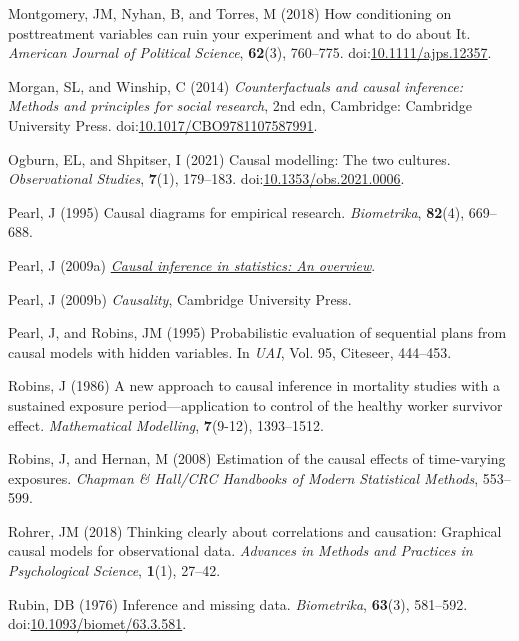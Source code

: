 \documentclass[
  singlecolumn]{article}
\newlength{\cslhangindent}
\newenvironment{CSLReferences}[2] %
 {\begin{list}{}{%
  \setlength{\itemindent}{0pt}
  \setlength{\leftmargin}{0pt}
  \setlength{\parsep}{0pt}
  \ifodd #1
   \setlength{\leftmargin}{\cslhangindent}
   \setlength{\itemindent}{-1\cslhangindent}
  \fi
  \setlength{\itemsep}{#2\baselineskip}}}
 {\end{list}}
\begin{document}
\begin{CSLReferences}{1}{0}
Montgomery, JM, Nyhan, B, and Torres, M (2018) How conditioning on
posttreatment variables can ruin your experiment and what to do about
It. \emph{American Journal of Political Science}, \textbf{62}(3),
760--775.
doi:\href{https://doi.org/10.1111/ajps.12357}{10.1111/ajps.12357}.

Morgan, SL, and Winship, C (2014) \emph{Counterfactuals and causal
inference: Methods and principles for social research}, 2nd edn,
Cambridge: Cambridge University Press.
doi:\href{https://doi.org/10.1017/CBO9781107587991}{10.1017/CBO9781107587991}.

Ogburn, EL, and Shpitser, I (2021) Causal modelling: The two cultures.
\emph{Observational Studies}, \textbf{7}(1), 179--183.
doi:\href{https://doi.org/10.1353/obs.2021.0006}{10.1353/obs.2021.0006}.

Pearl, J (1995) Causal diagrams for empirical research.
\emph{Biometrika}, \textbf{82}(4), 669--688.

Pearl, J (2009a) \emph{\href{https://doi.org/10.1214/09-SS057}{Causal
inference in statistics: An overview}}.

Pearl, J (2009b) \emph{Causality}, Cambridge University Press.

Pearl, J, and Robins, JM (1995) Probabilistic evaluation of sequential
plans from causal models with hidden variables. In \emph{UAI}, Vol. 95,
Citeseer, 444--453.

Robins, J (1986) A new approach to causal inference in mortality studies
with a sustained exposure period---application to control of the healthy
worker survivor effect. \emph{Mathematical Modelling}, \textbf{7}(9-12),
1393--1512.

Robins, J, and Hernan, M (2008) Estimation of the causal effects of
time-varying exposures. \emph{Chapman \& Hall/CRC Handbooks of Modern
Statistical Methods}, 553--599.

Rohrer, JM (2018) Thinking clearly about correlations and causation:
Graphical causal models for observational data. \emph{Advances in
Methods and Practices in Psychological Science}, \textbf{1}(1), 27--42.

Rubin, DB (1976) Inference and missing data. \emph{Biometrika},
\textbf{63}(3), 581--592.
doi:\href{https://doi.org/10.1093/biomet/63.3.581}{10.1093/biomet/63.3.581}.


\end{CSLReferences}
\end{document}
